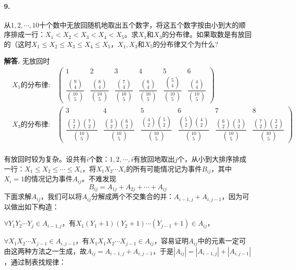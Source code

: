 \documentclass[12pt, a4paper, oneside]{ctexart}
\newenvironment{solution}{\par\noindent\textbf{解答. }}{\bigskip\par}
\begin{document}
\paragraph{9.}从$1,2,\cdots,10$十个数中无放回随机地取出五个数字，将这五个数字按由小到大的顺序排成一行：$X_1<X_2<X_3<X_4<X_5$。求$X_1$和$X_3$的分布律。如果取数是有放回的（这时$X_1\leqslant X_2\leqslant X_3\leqslant X_4\leqslant X_5$，$X_1,X_3$和$X_5$的分布律又个为什么?
\begin{solution}无放回时
    \begin{equation*}
        \begin{aligned}
            &X_1\text{的分布律:}\quad\left(\begin{matrix}
                1&2&3&4&5&6\\
                \dfrac{\binom{9}{4}}{\binom{10}{5}}&\dfrac{\binom{8}{4}}{\binom{10}{5}}&\dfrac{\binom{7}{4}}{\binom{10}{5}}&\dfrac{\binom{6}{4}}{\binom{10}{5}}&\dfrac{\binom{5}{4}}{\binom{10}{5}}&\dfrac{\binom{4}{4}}{\binom{10}{5}}
            \end{matrix}\right)\\
            &X_3\text{的分布律:}\quad\left(\begin{matrix}
                3&4&5&6&7&8\\
                \dfrac{\binom{2}{2}\binom{7}{2}}{\binom{10}{5}}&\dfrac{\binom{3}{2}\binom{6}{2}}{\binom{10}{5}}&\dfrac{\binom{4}{2}\binom{5}{2}}{\binom{10}{5}}&\dfrac{\binom{5}{2}\binom{4}{2}}{\binom{10}{5}}&\dfrac{\binom{6}{2}\binom{3}{2}}{\binom{10}{5}}&\dfrac{\binom{7}{2}\binom{2}{2}}{\binom{10}{5}}
            \end{matrix}\right)\\
        \end{aligned}
    \end{equation*}

    有放回时较为复杂。设共有$i$个数：$1,2,\cdots, i$有放回地取出$j$个，从小到大排序排成一行：$X_1\leqslant X_2\leqslant \cdots\leqslant X_i$，将$X_1X_2\cdots X_i$的所有可能情况记为事件$B_{ij}$，其中$X_i=1$的情况记为事件$A_{ij}$。不难发现
    \begin{equation*}
        B_{ij} = A_{1j}+A_{2j} +\cdots +A_{ij}
    \end{equation*}
    下面求解$A_{ij}$，我们可以将$A_{ij}$分解成两个不交集合的并：$A_{i-1,j}+A_{i,j-1}$，因为可以做出如下构造：
    
    $\forall Y_1Y_2\cdots Y_j\in A_{i-1,j}$，有$X_1(Y_1+1)(Y_2+1)\cdots(Y_{j-1}+1)\in A_{ij}$，

    $\forall X_1X_2\cdots X_{j-1}\in A_{i, j-1}$，有$X_1X_1X_2\cdots X_{j-1}\in A_{ij}$，容易证明$A_{ij}$中的元素一定可由这两种方法之一生成，故$A_{ij} = A_{i-1,j} + A_{i, j-1}$，于是$|A_{ij}| = |A_{i-1,j}|+|A_{i,j-1}|$，通过制表找规律：


\end{solution}
\end{document}
